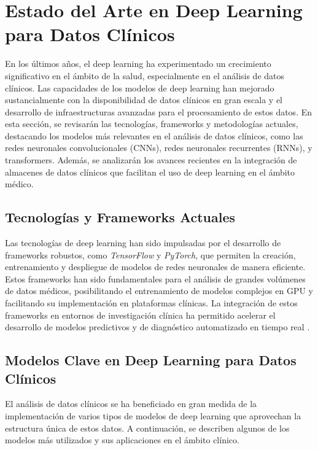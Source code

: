 \documentclass{article}
\begin{document}
\section{Estado del Arte en Deep Learning para Datos Clínicos}
\label{sec:estado_del_arte}

En los últimos años, el deep learning ha experimentado un crecimiento significativo en el ámbito de la salud, especialmente en el análisis de datos clínicos. Las capacidades de los modelos de deep learning han mejorado sustancialmente con la disponibilidad de datos clínicos en gran escala y el desarrollo de infraestructuras avanzadas para el procesamiento de estos datos. En esta sección, se revisarán las tecnologías, frameworks y metodologías actuales, destacando los modelos más relevantes en el análisis de datos clínicos, como las redes neuronales convolucionales (CNNs), redes neuronales recurrentes (RNNs), y transformers. Además, se analizarán los avances recientes en la integración de almacenes de datos clínicos que facilitan el uso de deep learning en el ámbito médico.

\subsection{Tecnologías y Frameworks Actuales}

Las tecnologías de deep learning han sido impulsadas por el desarrollo de frameworks robustos, como \textit{TensorFlow} y \textit{PyTorch}, que permiten la creación, entrenamiento y despliegue de modelos de redes neuronales de manera eficiente. Estos frameworks han sido fundamentales para el análisis de grandes volúmenes de datos médicos, posibilitando el entrenamiento de modelos complejos en GPU y facilitando su implementación en plataformas clínicas. La integración de estos frameworks en entornos de investigación clínica ha permitido acelerar el desarrollo de modelos predictivos y de diagnóstico automatizado en tiempo real \cite{abadi2016tensorflow, paszke2019pytorch}.

\subsection{Modelos Clave en Deep Learning para Datos Clínicos}

El análisis de datos clínicos se ha beneficiado en gran medida de la implementación de varios tipos de modelos de deep learning que aprovechan la estructura única de estos datos. A continuación, se describen algunos de los modelos más utilizados y sus aplicaciones en el ámbito clínico.
\end{document}
